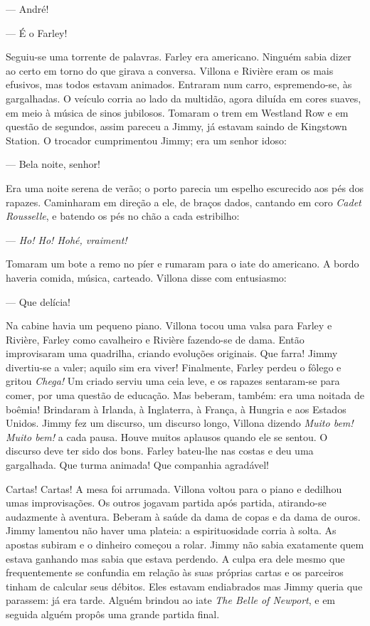 --- André!

--- É o Farley!

Seguiu-se uma torrente de palavras.  Farley era americano.  Ninguém sabia dizer
ao certo em torno do que girava a conversa.  Villona e Rivière eram os mais
efusivos, mas todos estavam animados.  Entraram num carro, espremendo-se, às
gargalhadas.  O veículo corria ao lado da multidão, agora diluída em cores
suaves, em meio à música de sinos jubilosos.  Tomaram o trem em Westland Row e
em questão de segundos, assim pareceu a Jimmy, já estavam saindo de Kingstown
Station.  O trocador cumprimentou Jimmy; era um senhor idoso:

--- Bela noite, senhor!

Era uma noite serena de verão; o porto parecia um espelho escurecido aos pés
dos rapazes.  Caminharam em direção a ele, de braços dados, cantando em coro
\textit{Cadet Rousselle}, e batendo os pés no chão a cada estribilho:

--- \textit{Ho! Ho! Hohé, vraiment!}

Tomaram um bote a remo no píer e rumaram para o iate do americano.  A bordo
haveria comida, música, carteado.  Villona disse com entusiasmo:

--- Que delícia!

Na cabine havia um pequeno piano.  Villona tocou uma valsa para Farley e
Rivière, Farley como cavalheiro e Rivière fazendo-se de dama.  Então
improvisaram uma quadrilha, criando evoluções originais.  Que farra!  Jimmy
divertiu-se a valer; aquilo sim era viver!  Finalmente, Farley perdeu o fôlego
e gritou \textit{Chega!}  Um criado serviu uma ceia leve, e os rapazes
sentaram-se para comer, por uma questão de educação.  Mas beberam, também: era
uma noitada de boêmia!  Brindaram à Irlanda, à Inglaterra, à França, à Hungria
e aos Estados Unidos.  Jimmy fez um discurso, um discurso longo, Villona
dizendo \textit{Muito bem! Muito bem!} a cada pausa.  Houve muitos aplausos
quando ele se sentou.  O discurso deve ter sido dos bons.  Farley bateu-lhe nas
costas e deu uma gargalhada.  Que turma animada!  Que companhia agradável!

Cartas! Cartas!  A mesa foi arrumada.  Villona voltou para o piano e dedilhou
umas improvisações.  Os outros jogavam partida após partida, atirando-se
audazmente à aventura.  Beberam à saúde da dama de copas e da dama de ouros.
Jimmy lamentou não haver uma plateia: a espirituosidade corria à solta.  As
apostas subiram e o dinheiro começou a rolar.  Jimmy não sabia exatamente quem
estava ganhando mas sabia que estava perdendo.  A culpa era dele mesmo que
frequentemente se confundia em relação às suas próprias cartas e os parceiros
tinham de calcular seus débitos.  Eles estavam endiabrados mas Jimmy queria que
parassem: já era tarde.  Alguém brindou ao iate \textit{The Belle of
Newport}, e em seguida alguém propôs uma grande partida final.

